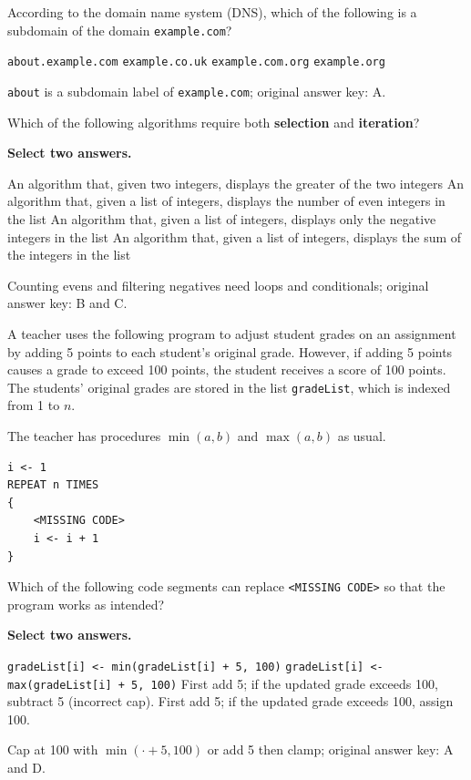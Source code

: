 \question[5]
According to the domain name system (DNS), which of the following is a subdomain of the domain \texttt{example.com}?
\begin{choices}
  \CorrectChoice \texttt{about.example.com}
  \choice \texttt{example.co.uk}
  \choice \texttt{example.com.org}
  \choice \texttt{example.org}
\end{choices}
\begin{solution}
  \texttt{about} is a subdomain label of \texttt{example.com}; original answer key: A.
\end{solution}

\newpage


\question[5]
Which of the following algorithms require both \textbf{selection} and \textbf{iteration}?

\textbf{Select two answers.}
\begin{checkboxes}
  \choice An algorithm that, given two integers, displays the greater of the two integers
  \CorrectChoice An algorithm that, given a list of integers, displays the number of even integers in the list
  \CorrectChoice An algorithm that, given a list of integers, displays only the negative integers in the list
  \choice An algorithm that, given a list of integers, displays the sum of the integers in the list
\end{checkboxes}
\begin{solution}
  Counting evens and filtering negatives need loops and conditionals; original answer key: B and C.
\end{solution}

\question[5]
A teacher uses the following program to adjust student grades on an assignment by adding 5 points to each student's original grade. However, if adding 5 points causes a grade to exceed 100 points, the student receives a score of 100 points. The students' original grades are stored in the list \texttt{gradeList}, which is indexed from 1 to $n$.

The teacher has procedures $\min(a,b)$ and $\max(a,b)$ as usual.

\begin{lstlisting}[style=pseudo]
i <- 1
REPEAT n TIMES
{
    <MISSING CODE>
    i <- i + 1
}
\end{lstlisting}

Which of the following code segments can replace \texttt{<MISSING CODE>} so that the program works as intended?

\textbf{Select two answers.}
\begin{checkboxes}
  \CorrectChoice \texttt{gradeList[i] <- min(gradeList[i] + 5, 100)}
  \choice \texttt{gradeList[i] <- max(gradeList[i] + 5, 100)}
  \choice First add 5; if the updated grade exceeds 100, subtract 5 (incorrect cap).
  \CorrectChoice First add 5; if the updated grade exceeds 100, assign 100.
\end{checkboxes}
\begin{solution}
  Cap at 100 with $\min(\cdot+5,100)$ or add 5 then clamp; original answer key: A and D.
\end{solution}

